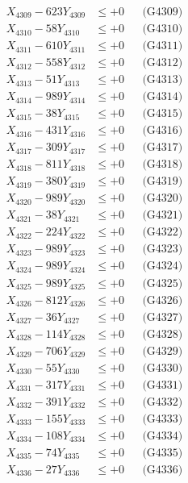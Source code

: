 \documentclass[a4paper,10pt]{article}
\begin{document}
{\begin{align}
X_{4309} - 623Y_{4309} &\leq +0 && \text{(G4309)} \\
X_{4310} - 58Y_{4310} &\leq +0 && \text{(G4310)} \\
\allowbreak
X_{4311} - 610Y_{4311} &\leq +0 && \text{(G4311)} \\
X_{4312} - 558Y_{4312} &\leq +0 && \text{(G4312)} \\
X_{4313} - 51Y_{4313} &\leq +0 && \text{(G4313)} \\
X_{4314} - 989Y_{4314} &\leq +0 && \text{(G4314)} \\
X_{4315} - 38Y_{4315} &\leq +0 && \text{(G4315)} \\
X_{4316} - 431Y_{4316} &\leq +0 && \text{(G4316)} \\
X_{4317} - 309Y_{4317} &\leq +0 && \text{(G4317)} \\
X_{4318} - 811Y_{4318} &\leq +0 && \text{(G4318)} \\
X_{4319} - 380Y_{4319} &\leq +0 && \text{(G4319)} \\
X_{4320} - 989Y_{4320} &\leq +0 && \text{(G4320)} \\
\allowbreak
X_{4321} - 38Y_{4321} &\leq +0 && \text{(G4321)} \\
X_{4322} - 224Y_{4322} &\leq +0 && \text{(G4322)} \\
X_{4323} - 989Y_{4323} &\leq +0 && \text{(G4323)} \\
X_{4324} - 989Y_{4324} &\leq +0 && \text{(G4324)} \\
X_{4325} - 989Y_{4325} &\leq +0 && \text{(G4325)} \\
X_{4326} - 812Y_{4326} &\leq +0 && \text{(G4326)} \\
X_{4327} - 36Y_{4327} &\leq +0 && \text{(G4327)} \\
X_{4328} - 114Y_{4328} &\leq +0 && \text{(G4328)} \\
X_{4329} - 706Y_{4329} &\leq +0 && \text{(G4329)} \\
X_{4330} - 55Y_{4330} &\leq +0 && \text{(G4330)} \\
\allowbreak
X_{4331} - 317Y_{4331} &\leq +0 && \text{(G4331)} \\
X_{4332} - 391Y_{4332} &\leq +0 && \text{(G4332)} \\
X_{4333} - 155Y_{4333} &\leq +0 && \text{(G4333)} \\
X_{4334} - 108Y_{4334} &\leq +0 && \text{(G4334)} \\
X_{4335} - 74Y_{4335} &\leq +0 && \text{(G4335)} \\
X_{4336} - 27Y_{4336} &\leq +0 && \text{(G4336)} \\

\end{align}}
\end{document}
